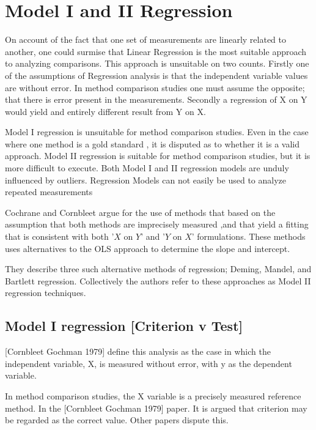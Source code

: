\documentclass[12pt, a4paper]{report}
\theoremstyle{plain}
\theoremstyle{definition}
\theoremstyle{remark}
\begin{document}




\section{Model I and II Regression}

On account of the fact that one set of measurements are linearly related to another, one could surmise that Linear Regression is the most suitable approach to analyzing comparisons. This approach is unsuitable on two counts. Firstly one of the assumptions of Regression analysis is that the independent variable values are without error. In method comparison studies one must assume the opposite; that there is error present in the measurements. Secondly a regression of X on Y would yield and entirely different result from Y on X.

Model I regression is unsuitable for method comparison studies. Even in the case where one method is a gold standard , it is disputed as to whether it is a valid approach. Model II regression is suitable for method comparison studies, but it is more difficult to execute. Both Model I and II regression models are unduly influenced by outliers.
Regression Models can not easily be used to analyze repeated measurements


Cochrane and Cornbleet argue for the use of methods that based on
the assumption that both methods are imprecisely measured ,and
that yield a fitting that is consistent with both '$X$ on $Y$' and
'$Y$ on $X$' formulations. These methods uses alternatives to the
OLS approach to determine the slope and intercept.

They describe three such alternative methods of regression; Deming, Mandel, and Bartlett regression. Collectively the authors refer to these approaches as Model II regression techniques.

\subsection{Model I regression [Criterion v Test]}
[Cornbleet Gochman 1979] define this analysis as the case in which the independent variable, X, is measured without error, with y as the dependent variable.
 
In method comparison studies, the X variable is a precisely measured reference method. In the [Cornbleet Gochman 1979] paper. It is argued that criterion may be regarded as the correct value. Other papers dispute this.
 
\end{document}
